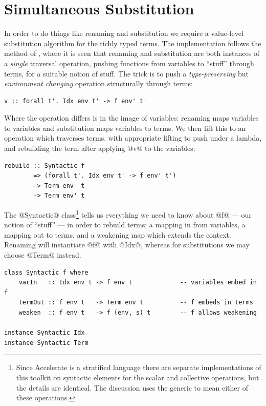 \section{Simultaneous Substitution}
\label{sec:substitution}

In order to do things like renaming and substitution we require a value-level
substitution algorithm for the richly typed terms. The implementation follows
the method of \citet{McBride:2006up,McBride:2005jv}, where it is seen that
renaming and substitution are both instances of a \emph{single} traversal
operation, pushing functions from variables to ``stuff'' through terms, for a
suitable notion of stuff.
%
The trick is to push a \emph{type-preserving} but \emph{environment changing}
operation structurally through terms:
%
\begin{lstlisting}[style=haskell]
v :: forall t'. Idx env t' -> f env' t'
\end{lstlisting}

Where the operation differs is in the image of variables: renaming maps
variables to variables and substitution maps variables to terms. We then lift
this to an operation which traverses terms, with appropriate lifting to push
under a lambda, and rebuilding the term after applying @v@ to the
variables:
%
\begin{lstlisting}[style=haskell]
rebuild :: Syntactic f
        => (forall t'. Idx env t' -> f env' t')
        -> Term env  t
        -> Term env' t
\end{lstlisting}

The @Syntactic@ class\footnote{Since Accelerate is a stratified language
there are separate implementations of this toolkit on syntactic elements for the
scalar and collective operations, but the details are identical. The discussion
uses the generic  to mean either of these operations.} tells us
everything we need to know about @f@ --- our notion of ``stuff'' --- in
order to rebuild terms: a mapping in from variables, a mapping out to terms, and
a weakening map which extends the context. Renaming will instantiate @f@
with @Idx@, whereas for substitutions we may choose @Term@ instead.
%
\begin{lstlisting}[style=haskell]
class Syntactic f where
    varIn   :: Idx env t -> f env t             -- variables embed in f
    termOut :: f env t   -> Term env t          -- f embeds in terms
    weaken  :: f env t   -> f (env, s) t        -- f allows weakening

instance Syntactic Idx
instance Syntactic Term
\end{lstlisting}

